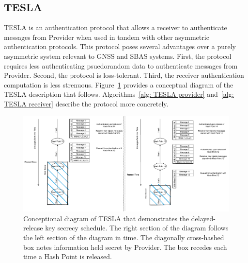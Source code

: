 \documentclass[letterpaper,times]{IONconf/IONconf}
\begin{document}
	\subsection{TESLA} \label{sub:tesla}

		TESLA is an authentication protocol that allows a receiver to authenticate messages from Provider when used in tandem with other asymmetric authentication protocols.
		This protocol poses several advantages over a purely asymmetric system relevant to GNSS and SBAS systems.
		First, the protocol requires less authenticating psuedorandom data to authenticate messages from Provider.
		Second, the protocol is loss-tolerant.
		Third, the receiver authentication computation is less strenuous.
		Figure~\ref{fig: TESLA Diagram} provides a conceptual diagram of the TESLA description that follows.
		Algorithms~\ref{alg: TESLA provider} and~\ref{alg: TESLA receiver} describe the protocol more concretely.
		\begin{figure}%
			\centering
			\includegraphics[width=\linewidth]{fig/TESLADiagram.pdf}
			\caption{
				Conceptional diagram of TESLA that demonstrates the delayed-release key secrecy schedule.
				The right section of the diagram follows the left section of the diagram in time.
				The diagonally cross-hashed box notes information held secret by Provider.
				The box recedes each time a Hash Point is released.
			}
			\label{fig: TESLA Diagram}
		\end{figure}
\end{document}
